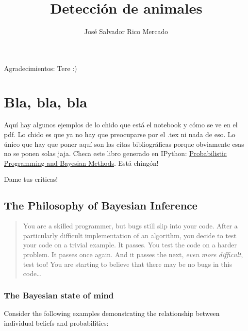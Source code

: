 \documentclass[titlepage]{article} %
\title{Detección de animales}
\author{José Salvador Rico Mercado}
\begin{document}
    
    
    
    \maketitle
    
    
	Agradecimientos: Tere :)
	\newpage
    \tableofcontents
	\newpage


    
    \section{Bla, bla, bla}\label{bla-bla-bla}

Aquí hay algunos ejemplos de lo chido que está el notebook y cómo se ve
en el pdf. Lo chido es que ya no hay que preocuparse por el .tex ni nada
de eso. Lo único que hay que poner aquí son las citas bibliográficas
porque obviamente esas no se ponen solas jaja. Checa este libro generado
en IPython:
\href{https://camdavidsonpilon.github.io/Probabilistic-Programming-and-Bayesian-Methods-for-Hackers/}{Probabilistic
Programming and Bayesian Methods}. Está chingón!

Dame tus críticas!

    \subsection{The Philosophy of Bayesian
Inference}\label{the-philosophy-of-bayesian-inference}

\begin{quote}
You are a skilled programmer, but bugs still slip into your code. After
a particularly difficult implementation of an algorithm, you decide to
test your code on a trivial example. It passes. You test the code on a
harder problem. It passes once again. And it passes the next, \emph{even
more difficult}, test too! You are starting to believe that there may be
no bugs in this code\ldots{} \cite{4th-paradigm}
\end{quote}

    \subsubsection{The Bayesian state of
mind}\label{the-bayesian-state-of-mind}

Consider the following examples demonstrating the relationship between
individual beliefs and probabilities:
\end{document}
